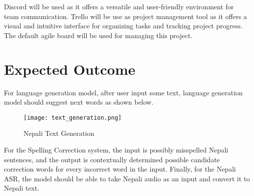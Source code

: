 Discord will be used as it offers a versatile and user-friendly environment for team communication. Trello will be use as project management tool as it offers a visual and intuitive interface for organizing tasks and tracking project progress. The default agile board will be used for managing this project.


\section{Expected Outcome}
For language generation model, after user input some text, language generation model should suggest next words as shown below.

\begin{figure}[H]
    \centering
    \texttt{[image: text\_generation.png]}
    \caption{Nepali Text Generation}
    \label{fig:Nepali Text Generation}
\end{figure}

For the Spelling Correction system, the input is possibly misspelled Nepali sentences, and the output is contextually determined possible candidate correction words for every incorrect word in the input. Finally, for the Nepali ASR, the model should be able to take Nepali audio as an input and convert it to Nepali text.

